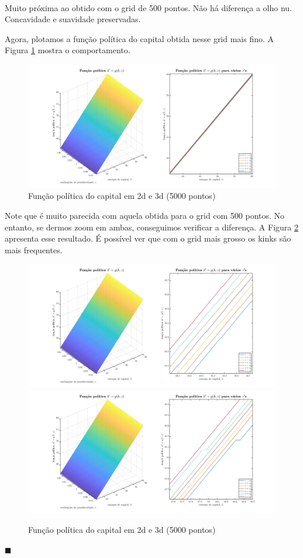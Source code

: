 \documentclass[10pt]{article}
\newcommand*{\QEDA}{\hfill\ensuremath{\blacksquare}}%
\newcommand\0{\mathbf{0}}
\newenvironment{sol}
    {\\[1em] {\color{magenta}\text{Resposta.}}
    }
    {{\color{blue!50!black}\QEDA}}
\begin{document}
\begin{enumerate}[wide]
\begin{sol}
Muito próxima ao obtido com o grid de 500 pontos. Não há diferença a olho nu. Concavidade e suavidade preservadas. 

\newpage

Agora, plotamos a função política do capital obtida nesse grid mais fino. A Figura \ref{fig6} mostra o comportamento.

\begin{figure}[htp!]
\centering
\includegraphics[scale=0.3]{capital_policy_function_brute_force_5000.png}
\caption{Função política do capital em 2d e 3d (5000 pontos)}
\label{fig6}
\end{figure}

Note que é muito parecida com aquela obtida para o grid com 500 pontos. No entanto, se dermos zoom em ambas, conseguimos verificar a diferença. A Figura \ref{fig7} apresenta esse resultado. É possível ver que com o grid mais grosso os kinks são mais frequentes.

\begin{figure}[htp!]
\centering
\includegraphics[scale=0.22]{capital_policy_function_brute_force_5000_zoom.png}
\includegraphics[scale=0.22]{capital_policy_function_brute_force_500_zoom.png}
\caption{Função política do capital em 2d e 3d (5000 pontos)}
\label{fig7}
\end{figure}


\end{sol}
\end{enumerate}
\end{document}
